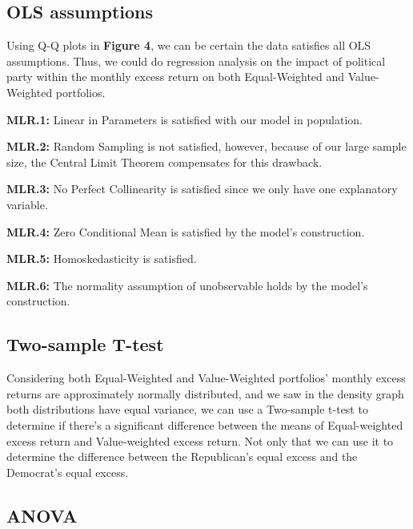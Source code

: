 \documentclass[a4paper]{article}
\begin{document}
\subsection{OLS assumptions}
\vspace{-10pt}
    \hspace{12pt} Using Q-Q plots in \textbf{Figure 4}, we can be certain the data satisfies all OLS assumptions. Thus, we could do regression analysis on the impact of political party within the monthly excess return on both Equal-Weighted and Value-Weighted portfolios.
    
    \textbf{MLR.1: } Linear in Parameters is satisfied with our model in population.

    \textbf{MLR.2: } Random Sampling is not satisfied, however, because of our large sample size, the Central Limit Theorem compensates for this drawback. 

    \textbf{MLR.3: } No Perfect Collinearity is satisfied since we only have one explanatory variable. 

    \textbf{MLR.4: } Zero Conditional Mean is satisfied by the model's construction. 

    \textbf{MLR.5: } Homoskedasticity is satisfied.

    \textbf{MLR.6: } The normality assumption of unobservable holds by the model's construction. 
\vspace{-10pt}
\subsection{Two-sample T-test}
\vspace{-10pt}
\hspace{12pt} Considering both Equal-Weighted and Value-Weighted portfolios' monthly excess returns are approximately normally distributed, and we saw in the density graph both distributions have equal variance, we can use a Two-sample t-test to determine if there's a significant difference between the means of Equal-weighted excess return and Value-weighted excess return. Not only that we can use it to determine the difference between the Republican's equal excess and the Democrat's equal excess. 

\vspace{-10pt}
\subsection{ANOVA}
\vspace{-10pt}
\end{document}
